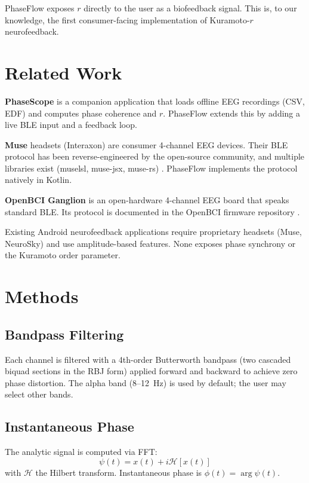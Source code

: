 \documentclass[11pt,a4paper]{article}
\begin{document}
PhaseFlow exposes $r$ directly to the user as a biofeedback signal. This is, to our knowledge, the first consumer-facing implementation of Kuramoto-$r$ neurofeedback.

\section{Related Work}

\textbf{PhaseScope} \cite{simoes2026phasescope} is a companion application that loads offline EEG recordings (CSV, EDF) and computes phase coherence and $r$. PhaseFlow extends this by adding a live BLE input and a feedback loop.

\textbf{Muse} headsets (Interaxon) are consumer 4-channel EEG devices. Their BLE protocol has been reverse-engineered by the open-source community, and multiple libraries exist (muselsl, muse-jsx, muse-rs) \cite{museble}. PhaseFlow implements the protocol natively in Kotlin.

\textbf{OpenBCI Ganglion} is an open-hardware 4-channel EEG board that speaks standard BLE. Its protocol is documented in the OpenBCI firmware repository \cite{openbci}.

Existing Android neurofeedback applications require proprietary headsets (Muse, NeuroSky) and use amplitude-based features. None exposes phase synchrony or the Kuramoto order parameter.

\section{Methods}

\subsection{Bandpass Filtering}

Each channel is filtered with a 4th-order Butterworth bandpass (two cascaded biquad sections in the RBJ form) applied forward and backward to achieve zero phase distortion. The alpha band (8--12~Hz) is used by default; the user may select other bands.

\subsection{Instantaneous Phase}

The analytic signal is computed via FFT:
\begin{equation}
\psi(t) = x(t) + i \mathcal{H}[x(t)]
\end{equation}
with $\mathcal{H}$ the Hilbert transform. Instantaneous phase is $\phi(t) = \arg \psi(t)$.
\end{document}
